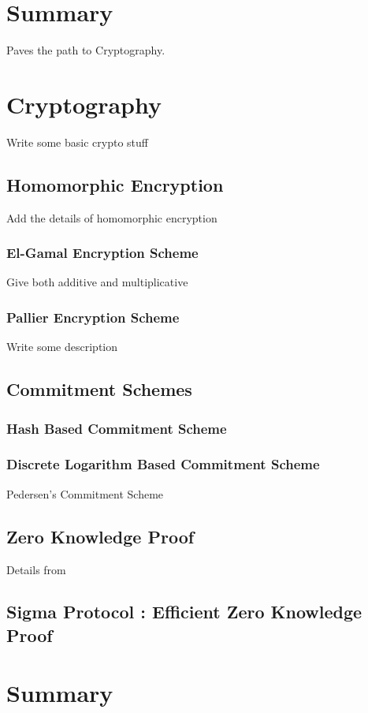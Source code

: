   
\section{Summary} 
  Paves the path to Cryptography. 
    
\section{Cryptography}
    Write some basic crypto stuff
    
    \subsection{Homomorphic Encryption}
     Add the details of 
     homomorphic encryption 
     \subsubsection{El-Gamal Encryption Scheme}
        Give both additive and multiplicative
     \subsubsection{Pallier Encryption Scheme}
        Write some description
     \subsection{Commitment Schemes}   
        \subsubsection{Hash Based Commitment Scheme}
        \subsubsection{Discrete Logarithm Based Commitment Scheme}
         Pedersen's Commitment Scheme
     \subsection{Zero Knowledge Proof}
  		Details from 
  	 \subsection{Sigma Protocol : Efficient Zero Knowledge Proof}
  



\section{Summary}










